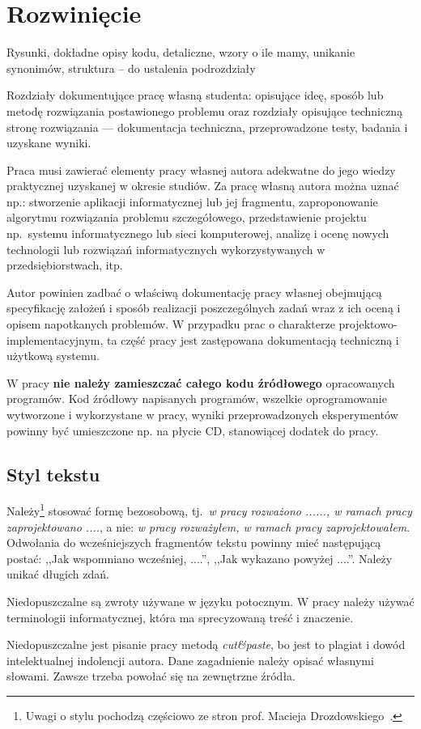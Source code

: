 
\chapter{Rozwinięcie}

Rysunki, dokładne opisy kodu, detaliczne, wzory o ile mamy, unikanie synonimów, struktura – do ustalenia podrozdziały


Rozdziały dokumentujące pracę własną studenta: opisujące ideę, sposób lub metodę 
rozwiązania postawionego problemu oraz rozdziały opisujące techniczną stronę rozwiązania 
--- dokumentacja techniczna, przeprowadzone testy, badania i uzyskane wyniki. 

Praca musi zawierać elementy pracy własnej autora adekwatne do jego wiedzy praktycznej uzyskanej w
okresie studiów. Za pracę własną autora można uznać np.: stworzenie aplikacji informatycznej lub jej
fragmentu, zaproponowanie algorytmu rozwiązania problemu szczegółowego, przedstawienie projektu 
np.~systemu informatycznego lub sieci komputerowej, analizę i ocenę nowych technologii lub rozwiązań
informatycznych wykorzystywanych w przedsiębiorstwach, itp. 

Autor powinien zadbać o właściwą dokumentację pracy własnej obejmującą specyfikację założeń i 
sposób realizacji poszczególnych zadań
wraz z ich oceną i opisem napotkanych problemów. W przypadku prac o charakterze 
projektowo-implementacyjnym, ta część pracy jest zastępowana dokumentacją techniczną i użytkową systemu. 

W pracy \textbf{nie należy zamieszczać całego kodu źródłowego} opracowanych programów. Kod źródłowy napisanych
programów, wszelkie oprogramowanie wytworzone i wykorzystane w pracy, wyniki przeprowadzonych
eksperymentów powinny być umieszczone np. na płycie CD, stanowiącej dodatek do pracy.

\section*{Styl tekstu}

Należy\footnote{Uwagi o stylu pochodzą częściowo ze stron prof. Macieja Drozdowskiego~\cite{Drozdowski2006}.} 
stosować formę bezosobową, tj.~\emph{w pracy rozważono ......, 
w ramach pracy zaprojektowano ....}, a nie: \emph{w pracy rozważyłem, w ramach pracy zaprojektowałem}. 
Odwołania do wcześniejszych fragmentów tekstu powinny mieć następującą postać: ,,Jak wspomniano wcześniej, ....'', 
,,Jak wykazano powyżej ....''. Należy unikać długich zdań. 

Niedopuszczalne są zwroty używane w języku potocznym. W pracy należy używać terminologii informatycznej, która ma 
sprecyzowaną treść i znaczenie. 

Niedopuszczalne jest pisanie pracy metodą \emph{cut\&paste}, bo jest to plagiat i dowód intelektualnej indolencji autora.
Dane zagadnienie należy opisać własnymi słowami. Zawsze trzeba powołać się na zewnętrzne źródła. 

